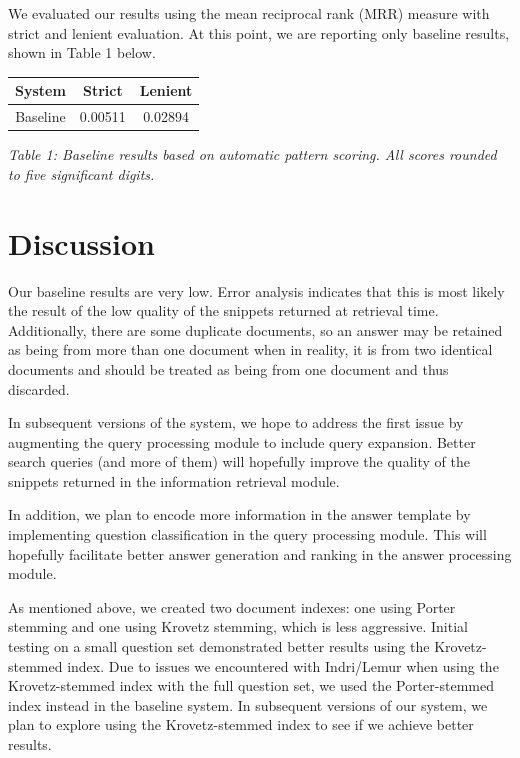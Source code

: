 \documentclass[11pt]{article}
\begin{document}
We evaluated our results using the mean reciprocal rank (MRR) measure with strict and lenient evaluation. At this point, we are reporting only baseline results, shown in Table 1 below.

\vspace{5mm}
{\centering
\begin{tabular}{|c|c|c|}
\hline
\textbf{System} & \textbf{Strict} & \textbf{Lenient} \\ \hline
Baseline & 0.00511 & 0.02894 \\ \hline
\end{tabular}

\vspace{1mm}
\emph{Table 1: Baseline results based on automatic pattern scoring. All scores rounded to five significant digits.}
\par}

\section{Discussion}

Our baseline results are very low.  Error analysis indicates that this is most likely the result of the low quality of the snippets returned at retrieval time.  Additionally, there are some duplicate documents, so an answer may be retained as being from more than one document when in reality, it is from two identical documents and should be treated as being from one document and thus discarded.

In subsequent versions of the system, we hope to address the first issue by augmenting the query processing module to include query expansion. Better search queries (and more of them) will hopefully improve the quality of the snippets returned in the information retrieval module.

In addition, we plan to encode more information in the answer template by implementing question classification in the query processing module. This will hopefully facilitate better answer generation and ranking in the answer processing module.

As mentioned above, we created two document indexes: one using Porter stemming and one using Krovetz stemming, which is less aggressive. Initial testing on a small question set demonstrated better results using the Krovetz-stemmed index. Due to issues we encountered with Indri/Lemur when using the Krovetz-stemmed index with the full question set, we used the Porter-stemmed index instead in the baseline system. In subsequent versions of our system, we plan to explore using the Krovetz-stemmed index to see if we achieve better results.
\end{document}
